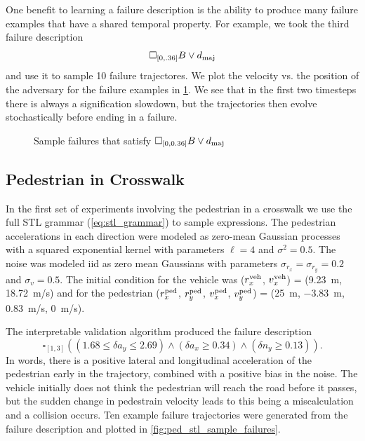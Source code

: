 One benefit to learning a failure description is the ability to produce many failure examples that have a shared temporal property. For example, we took the third failure description
\begin{equation}
    \square_{[0, .36]} B \lor d_{\rm maj}
\end{equation}
and use it to sample \num{10} failure trajectores. We plot the velocity vs. the position of the adversary for the failure examples in \cref{fig:2car_failure_samples}. We see that in the first two timesteps there is always a signification slowdown, but the trajectories then evolve stochastically before ending in a failure. 

\begin{figure}
    \centering
    
    \caption{Sample failures that satisfy $\square_{[0, 0.36]} B \lor d_{\rm maj}$}
    \label{fig:2car_failure_samples}
\end{figure}


\subsection{Pedestrian in Crosswalk}

In the first set of experiments involving the pedestrian in a crosswalk we use the full STL grammar (\cref{eq:stl_grammar}) to sample expressions. The pedestrian accelerations in each direction were modeled as zero-mean Gaussian processes with a squared exponential kernel with parameters $\ell = 4$ and $\sigma^2 = 0.5$. The noise was modeled iid as zero mean Gaussians with parameters $\sigma_{r_x} = \sigma_{r_y} = 0.2$ and $\sigma_{v} = 0.5$. The initial condition for the vehicle was ($r_x^{\rm veh}$, $v_x^{\rm veh}$) = (\SI{9.23}{m}, \SI{18.72}{m/s}) and for the pedestrian ($r^{\rm ped}_x$, $r^{\rm ped}_y$, $v^{\rm ped}_x$, $v^{\rm ped}_y$) = (\SI{25}{m}, \SI{-3.83}{m}, \SI{0.83}{m/s}, \SI{0}{m/s}).

The interpretable validation algorithm produced the failure description
\begin{equation}
\square_{[1,3]}\left((1.68 \leq \delta a_y \leq 2.69) \land (\delta a_x \geq 0.34) \land (\delta n_y \geq 0.13) \right) \label{eq:failure_description_pedstl} \text{.}
\end{equation}
In words, there is a positive lateral and longitudinal acceleration of the pedestrian early in the trajectory, combined with a positive bias in the noise. The vehicle initially does not think the pedestrian will reach the road before it passes, but the sudden change in pedestrain velocity leads to this being a miscalculation and a collision occurs. Ten example failure trajectories were generated from the failure description and plotted in \cref{fig:ped_stl_sample_failures}.

